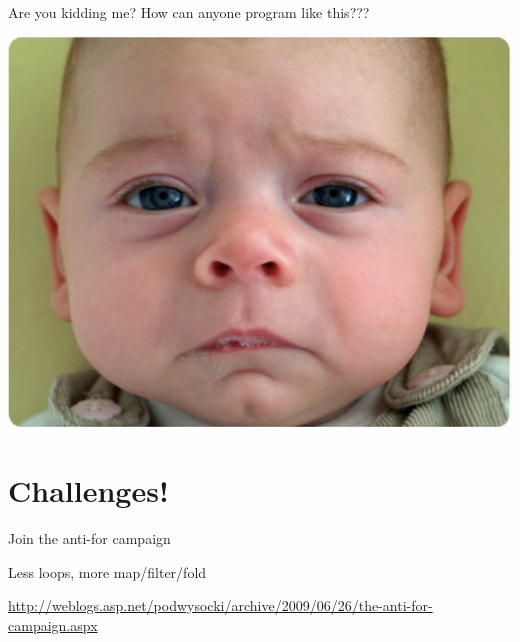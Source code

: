 \documentclass[mathserif]{beamer}
\begin{document}
\begin{frame}{Are you kidding me?}
  How can anyone program like this???
  \begin{center}
    \includegraphics[scale=0.3]{img/sadbaby.png}
  \end{center}
\end{frame}

\section{Challenges!}

\begin{frame}{Join the anti-for campaign}

  \begin{center}
    {\Huge Less loops, more map/filter/fold}
  \end{center}
  \vskip5mm
  \url{http://weblogs.asp.net/podwysocki/archive/2009/06/26/the-anti-for-campaign.aspx}
  
\end{frame}
\end{document}
